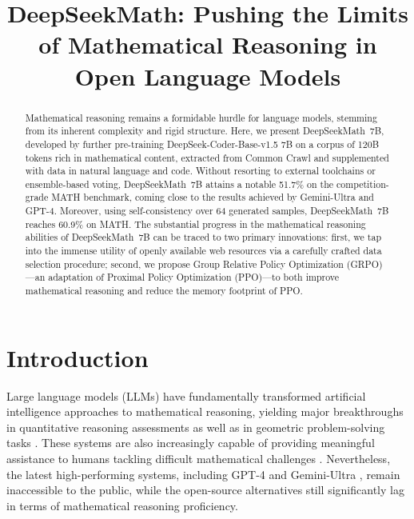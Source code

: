 \title{DeepSeekMath: Pushing the Limits of Mathematical Reasoning in Open Language Models}

\begin{abstract}
Mathematical reasoning remains a formidable hurdle for language models, stemming from its inherent complexity and rigid structure. Here, we present DeepSeekMath~7B, developed by further pre-training DeepSeek-Coder-Base-v1.5 7B on a corpus of 120B tokens rich in mathematical content, extracted from Common Crawl and supplemented with data in natural language and code. Without resorting to external toolchains or ensemble-based voting, DeepSeekMath~7B attains a notable 51.7\% on the competition-grade MATH benchmark, coming close to the results achieved by Gemini-Ultra and GPT-4. Moreover, using self-consistency over 64 generated samples, DeepSeekMath~7B reaches 60.9\% on MATH. The substantial progress in the mathematical reasoning abilities of DeepSeekMath~7B can be traced to two primary innovations: first, we tap into the immense utility of openly available web resources via a carefully crafted data selection procedure; second, we propose Group Relative Policy Optimization (GRPO)—an adaptation of Proximal Policy Optimization (PPO)—to both improve mathematical reasoning and reduce the memory footprint of PPO.
\end{abstract}

\section{Introduction}

Large language models (LLMs) have fundamentally transformed artificial intelligence approaches to mathematical reasoning, yielding major breakthroughs in quantitative reasoning assessments \citep{MATH} as well as in geometric problem-solving tasks \citep{trinh2024solving}. These systems are also increasingly capable of providing meaningful assistance to humans tackling difficult mathematical challenges \citep{tao}. Nevertheless, the latest high-performing systems, including GPT-4 \citep{gpt4} and Gemini-Ultra \citep{gemini}, remain inaccessible to the public, while the open-source alternatives still significantly lag in terms of mathematical reasoning proficiency.

